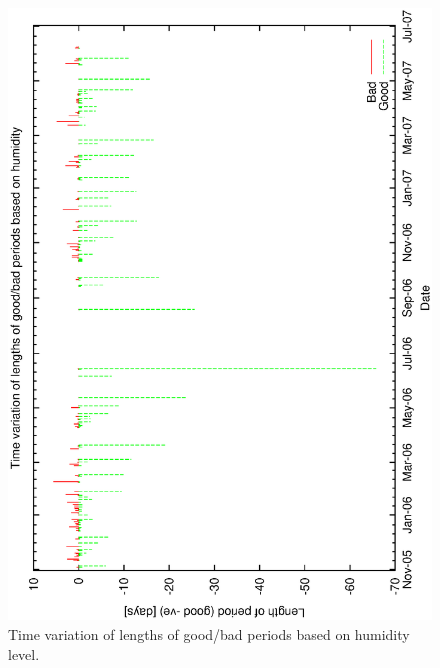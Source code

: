 {{\begin{figure}[htbp]
\begin{center}
    \includegraphics[scale=0.4, angle=-90]{figures/ecs/gbc_period.eps}
\end{center}
\caption[Time variation of lengths of good/bad periods based on humidity level.]
{Time variation of lengths of good/bad periods based on humidity level.}
\label{fig:good_bad_period_time}
\end{figure}


}}
